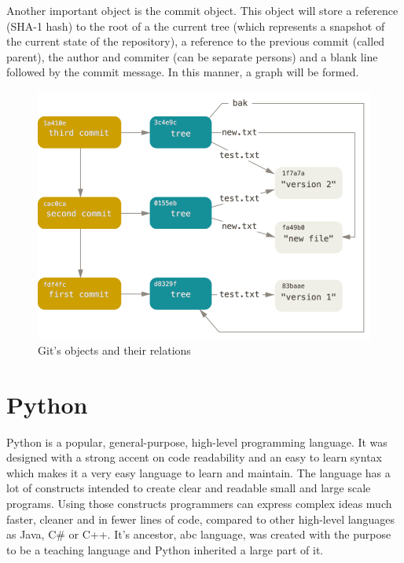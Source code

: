         Another important object is the commit object. This object will store a reference (SHA-1 hash) to the root of a the current tree (which represents a snapshot of the current state of the repository), a reference to the previous commit (called parent), the author and commiter (can be separate persons) and a blank line followed by the commit message. In this manner, a graph will be formed.
        
         \begin{figure}[h]
           \begin{center}
               \includegraphics[width=15cm]{theoretical/data-model-3.png}
            \end{center}
            \label{fig:git-objects}\caption{Git's objects and their relations \cite{GDM}}
        \end{figure}
    
\section{Python}
    Python is a popular, general-purpose, high-level programming language. It was designed with a strong accent on code readability and an easy to learn syntax which makes it a very easy language to learn and maintain. The language has a lot of constructs intended to create clear and readable small and large scale programs. Using those constructs programmers can express complex ideas much faster, cleaner and in fewer lines of code, compared to other high-level languages as Java, C\# or C++. It's ancestor, abc language, was created with the purpose to be a teaching language and Python inherited a large part of it.
    
